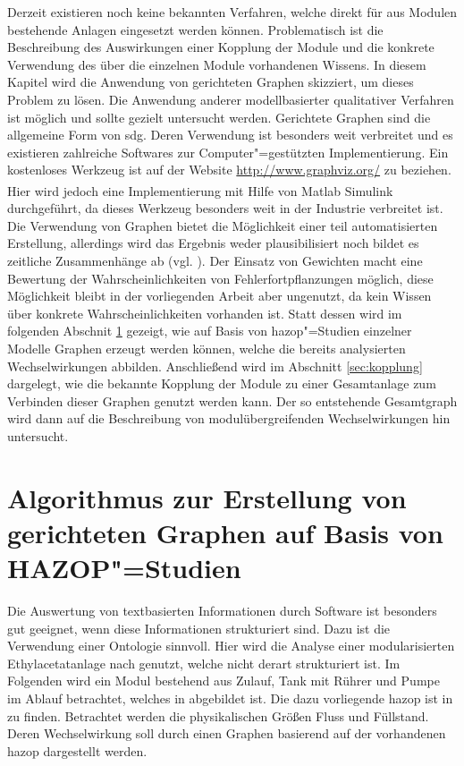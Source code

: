 Derzeit existieren noch keine bekannten Verfahren, welche direkt f\"ur aus Modulen bestehende Anlagen eingesetzt werden k\"onnen. Problematisch ist die Beschreibung des Auswirkungen einer Kopplung der Module und die konkrete Verwendung des \"uber die einzelnen Module vorhandenen Wissens. In diesem Kapitel wird die Anwendung von gerichteten Graphen skizziert, um dieses Problem zu l\"osen. Die Anwendung anderer modellbasierter qualitativer Verfahren ist m\"oglich und sollte gezielt untersucht werden. Gerichtete Graphen sind die allgemeine Form von \acf{sdg}. Deren Verwendung ist besonders weit verbreitet und es existieren zahlreiche Softwares zur Computer"=gest\"utzten Implementierung. Ein kostenloses Werkzeug ist auf der Website \url{http://www.graphviz.org/} zu beziehen. Hier wird jedoch eine Implementierung mit Hilfe von Matlab Simulink\textsuperscript{\textregistered} durchgef\"uhrt, da dieses Werkzeug besonders weit in der Industrie verbreitet ist. \newline
Die Verwendung von Graphen bietet die M\"oglichkeit einer teil automatisierten Erstellung, allerdings wird das Ergebnis weder plausibilisiert noch bildet es zeitliche Zusammenh\"ange ab {(vgl. \cite{Yang_2010})}. Der Einsatz von Gewichten macht eine Bewertung der Wahrscheinlichkeiten von Fehlerfortpflanzungen m\"oglich, diese M\"oglichkeit bleibt in der vorliegenden Arbeit aber ungenutzt, da kein Wissen \"uber konkrete Wahrscheinlichkeiten vorhanden ist. Statt dessen wird im folgenden Abschnit \ref{sec:graphHazop} gezeigt, wie auf Basis von \ac{hazop}"=Studien einzelner Modelle Graphen erzeugt werden k\"onnen, welche die bereits analysierten Wechselwirkungen abbilden. Anschlie\ss{}end wird im Abschnitt \ref{sec:kopplung} dargelegt, wie die bekannte Kopplung der Module zu einer Gesamtanlage zum Verbinden dieser Graphen genutzt werden kann. Der so entstehende Gesamtgraph wird dann auf die Beschreibung von modul\"ubergreifenden Wechselwirkungen hin untersucht. 

\section{Algorithmus zur Erstellung von gerichteten Graphen auf Basis von HAZOP"=Studien}\label{sec:graphHazop}
Die Auswertung von textbasierten Informationen durch Software ist besonders gut geeignet, wenn diese Informationen strukturiert sind. Dazu ist die Verwendung einer Ontologie sinnvoll. Hier wird die Analyse einer modularisierten Ethylacetatanlage nach \cite{Pfeffer_2016, Pfeffer_2017} genutzt, welche nicht derart strukturiert ist. Im Folgenden wird ein Modul bestehend aus Zulauf, Tank mit R\"uhrer und Pumpe im Ablauf betrachtet, welches in  abgebildet ist. Die dazu vorliegende \ac{hazop} ist in  zu finden. Betrachtet werden die physikalischen Gr\"o\ss{}en Fluss und F\"ullstand. Deren Wechselwirkung soll durch einen Graphen basierend auf der vorhandenen \ac{hazop} dargestellt werden.  

